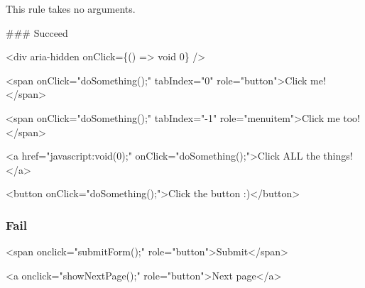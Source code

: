 This rule takes no arguments.

\#\#\# Succeed 
\begin{DoxyCode}
<div aria-hidden onClick=\{() => void 0\} />

<span onClick="doSomething();" tabIndex="0" role="button">Click me!</span>

<span onClick="doSomething();" tabIndex="-1" role="menuitem">Click me too!</span>

<a href="javascript:void(0);" onClick="doSomething();">Click ALL the things!</a>

<button onClick="doSomething();">Click the button :)</button>
\end{DoxyCode}


\subsubsection*{Fail}


\begin{DoxyCode}
<span onclick="submitForm();" role="button">Submit</span>

<a onclick="showNextPage();" role="button">Next page</a>
\end{DoxyCode}
 